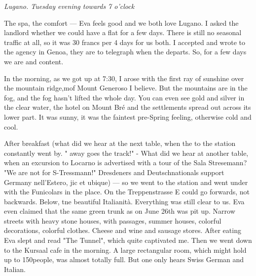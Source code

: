 \textit{Lugano. Tuesday evening towards 7 o'clock}

The spa, the comfort — Eva feels good and we both love Lugano. I asked the landlord whether we could have a flat for a few days. There is still no seasonal traffic at all, so it was 30 francs per 4 days for us both. I accepted and wrote to the agency in Genoa, they are to telegraph when the  departs. So, for a few days we are  and content.

In the morning, as we got up at 7:30, I arose with the first ray of sunshine over the mountain ridge,mof Mount Generoso I believe. But the mountains are in the fog, and the fog hasn't lifted the whole day. You can even see gold and silver in the clear water, the hotel on Mount Bré and the settlements spread out across its lower part. It was sunny, it was the faintest pre-Spring feeling, otherwise cold and cool. \missing

After breakfast (what did we hear at the next table, when the  to the station constantly went by. " away goes the track!" - What did we hear at another table, when an excursion to Locarno is advertised with a tour of the Sala Stresemann? "We are not for S-Tressmann!" Dresdeners and Deutschnationals support Germany nell'Estero, jic et ubique) — so we went to the station and went under with the Funicolars in the place. On the Treppenstrasse E could go forwards, not backwards. Below, tne beautiful Italianità. Everything was still clear to us. Eva even claimed that the same green trunk as on June 26th was pit up. Narrow streets with heavy stone houses, with passages, summer houses, colorful decorations, colorful clothes. Cheese and wine and sausage stores. \missing
After eating Eva slept and read "The Tunnel", which quite captivated me. Then we went down to the Kursaal cafe in the morning. A large rectangular room, which might hold up to 150people, was almost totally full. But one only hears Swiss German and Italian. \a